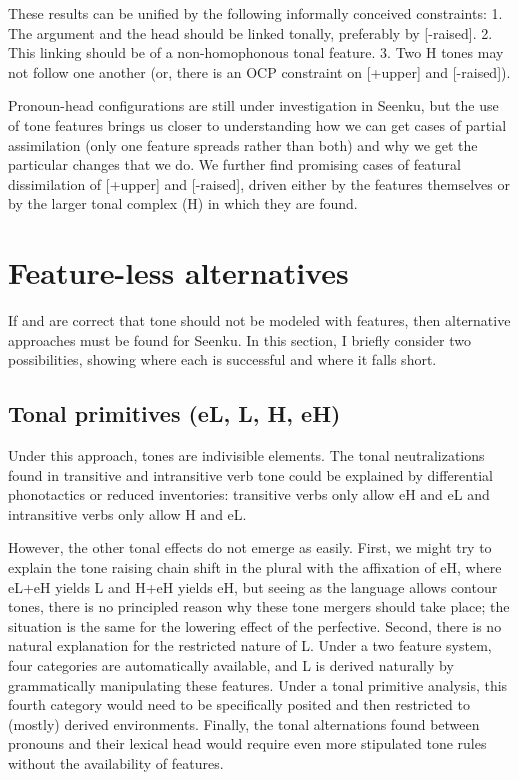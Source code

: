 \documentclass[output=paper]{langsci/langscibook}
\begin{document}
These results can be unified by the following informally conceived constraints: 1. The argument and the head should be linked tonally, preferably by [-raised]. 2. This linking should be of a non-homophonous tonal feature. 3. Two H tones may not follow one another (or, there is an OCP constraint on [+upper] and [-raised]). 

Pronoun-head configurations are still under investigation in Seenku, but the use of tone features brings us closer to understanding how we can get cases of partial assimilation (only one feature spreads rather than both) and why we get the particular changes that we do. We further find promising cases of featural dissimilation of [+upper] and [-raised], driven either by the features themselves or by the larger tonal complex (H) in which they are found.



\section{Feature-less alternatives}\label{sec:mcpherson:SecAlternatives}

If \citet{Hyman10b} and \citet{Clementsetal10} are correct that tone should not be modeled with features, then alternative approaches must be found for Seenku. In this section, I briefly consider two possibilities, showing where each is successful and where it falls short.

\subsection{Tonal primitives (eL, L, H, eH)}\label{sec:mcpherson:5.1}

Under this approach, tones are indivisible elements. The tonal neutralizations found in transitive and intransitive verb tone could be explained by differential phonotactics or reduced inventories: transitive verbs only allow eH and eL and intransitive verbs only allow H and eL.

However, the other tonal effects do not emerge as easily. First, we might try to explain the tone raising chain shift in the plural with the affixation of eH, where eL+eH yields L and H+eH yields eH, but seeing as the language allows contour tones, there is no principled reason why these tone mergers should take place; the situation is the same for the lowering effect of the perfective. Second, there is no natural explanation for the restricted nature of L. Under a two feature system, four categories are automatically available, and L is derived naturally by grammatically manipulating these features. Under a tonal primitive analysis, this fourth category would need to be specifically posited and then restricted to (mostly) derived environments. Finally, the tonal alternations found between pronouns and their lexical head would require even more stipulated tone rules without the availability of features.
\end{document}
